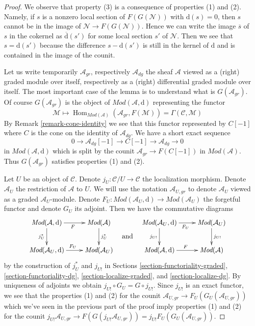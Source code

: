 \documentclass[10pt,a4paper]{amsart}
\theoremstyle{plain}
\theoremstyle{definition}
\theoremstyle{remark}
\numberwithin{equation}{subsection}
\def\Hom{\mathop{\mathrm{Hom}}\nolimits}
\begin{document}
\begin{proof}
We observe that property (3) is a consequence of properties (1) and (2).
Namely, if $s$ is a nonzero local section of $F(G(\mathcal{N}))$
with $\text{d}(s) = 0$, then $s$ cannot be in the image of
$\mathcal{N} \to F(G(\mathcal{N}))$. Hence we can write the image
$\overline{s}$ of $s$ in the cokernel as
$\overline{\text{d}}(s')$ for some local section $s'$ of $\mathcal{N}$.
Then we see that $s = \text{d}(s')$ because the difference
$s - \text{d}(s')$ is still in the kernel of $\text{d}$
and is contained in the image of the counit.

\medskip\noindent
Let us write temporarily $\mathcal{A}_{gr}$, respectively $\mathcal{A}_{dg}$
the sheaf $\mathcal{A}$ viewed as a (right) graded module over itself,
respectively as a (right) differential graded module over itself.
The most important case of the lemma is to understand what
is $G(\mathcal{A}_{gr})$. Of course $G(\mathcal{A}_{gr})$ is the object
of $\textit{Mod}(\mathcal{A}, \text{d})$ representing the
functor
$$
\mathcal{M} \longmapsto
\Hom_{\textit{Mod}(\mathcal{A})}(\mathcal{A}_{gr}, F(\mathcal{M})) =
\Gamma(\mathcal{C}, \mathcal{M})
$$
By Remark \ref{remark-cone-identity} we see that this functor represented
by $C[-1]$ where $C$ is the cone on the identity of $\mathcal{A}_{dg}$.
We have a short exact sequence
$$
0 \to \mathcal{A}_{dg}[-1] \to C[-1] \to \mathcal{A}_{dg} \to 0
$$
in $\textit{Mod}(\mathcal{A}, \text{d})$ which is split by the
counit $\mathcal{A}_{gr} \to F(C[-1])$ in $\textit{Mod}(\mathcal{A})$.
Thus $G(\mathcal{A}_{gr})$ satisfies properties (1) and (2).

\medskip\noindent
Let $U$ be an object of $\mathcal{C}$. Denote
$j_U : \mathcal{C}/U \to \mathcal{C}$ the localization morphism.
Denote $\mathcal{A}_U$ the restriction of $\mathcal{A}$ to $U$.
We will use the notation $\mathcal{A}_{U, gr}$ to denote
$\mathcal{A}_U$ viewed as a graded $\mathcal{A}_U$-module.
Denote $F_U : \textit{Mod}(\mathcal{A}_U, \text{d}) \to
\textit{Mod}(\mathcal{A}_U)$ the forgetful functor and denote
$G_U$ its adjoint. Then we have the commutative diagrams
$$
\vcenter{
\xymatrix{
\textit{Mod}(\mathcal{A}, \text{d}) \ar[d]_{j_U^*} \ar[r]_F &
\textit{Mod}(\mathcal{A}) \ar[d]^{j_U^*} \\
\textit{Mod}(\mathcal{A}_U, \text{d}) \ar[r]^{F_U} &
\textit{Mod}(\mathcal{A}_U)
}
}
\quad\text{and}\quad
\vcenter{
\xymatrix{
\textit{Mod}(\mathcal{A}_U, \text{d}) \ar[r]_{F_U} \ar[d]_{j_{U!}} &
\textit{Mod}(\mathcal{A}_U) \ar[d]^{j_{U!}} \\
\textit{Mod}(\mathcal{A}, \text{d}) \ar[r]^F &
\textit{Mod}(\mathcal{A})
}
}
$$
by the construction of $j^*_U$ and $j_{U!}$ in
Sections \ref{section-functoriality-graded},
\ref{section-functoriality-dg},
\ref{section-localize-graded}, and
\ref{section-localize-dg}.
By uniqueness of adjoints we obtain $j_{U!} \circ G_U = G \circ j_{U!}$.
Since $j_{U!}$ is an exact functor, we see that the properties
(1) and (2) for the counit
$\mathcal{A}_{U, gr} \to F_U(G_U(\mathcal{A}_{U, gr}))$
which we've seen in the previous part of the proof
imply properties (1) and (2) for the counit
$j_{U!}\mathcal{A}_{U, gr} \to F(G(j_{U!}\mathcal{A}_{U, gr})) =
j_{U!}F_U(G_U(\mathcal{A}_{U, gr}))$.


\end{proof}
\end{document}
